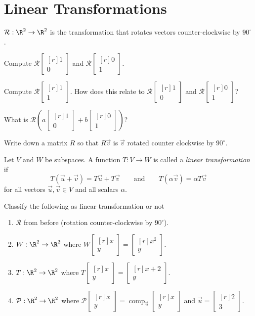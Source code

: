 \documentclass{problemset}
\DeclareMathOperator{\Comp}{comp}
\newcommand{\mat}[1]{\begin{bmatrix*}[r]#1\end{bmatrix*}}
\begin{document}
\hfill
\vfill







	\newpage
\pagestyle{siefken}
\section*{Linear Transformations}
\vspace{-1.5em}
	
	\question
	$\mathcal R:\R^2\to\R^2$ is the transformation that rotates vectors counter-clockwise 
	by $90^\circ$.
	\begin{parts}
		\item Compute $\mathcal R\mat{1\\0}$ and $\mathcal R\mat{0\\1}$.
		\item Compute $\mathcal R\mat{1\\1}$.  How does this relate to
			$\mathcal R\mat{1\\0}$ and $\mathcal R\mat{0\\1}$?
		\item What is $\mathcal R\left(a\mat{1\\0}+b\mat{0\\1}\right)$?
		\item Write down a matrix $R$ so that $R\vec v$ is $\vec v$ rotated
			counter clockwise by $90^\circ$.
	\end{parts}

	\begin{definition}
		Let $V$ and $W$ be subspaces. A function $T:V\to W$ is called a \emph{linear transformation}
		if 
		\[
			T(\vec u+\vec v)=T\vec u+T\vec v \qquad\text{and}\qquad
			T(\alpha \vec v)=\alpha T\vec v
		\]
		for all vectors $\vec u,\vec v\in V$ and all scalars $\alpha$.
	\end{definition}

	\question
	\begin{parts}
		\item Classify the following as linear transformation or not
			\begin{enumerate}
				\item $\mathcal R$ from before (rotation counter-clockwise by $90^\circ$).
				\item $W:\R^2\to\R^2$ where $W\mat{x\\y}=\mat{x^2\\y}$.
				\item $T:\R^2\to\R^2$ where $T\mat{x\\y}=\mat{x+2\\y}$.
				\item $\mathcal P:\R^2\to\R^2$ where 
					$\mathcal P\mat{x\\y}=\Comp_{\vec u}\mat{x\\y}$ and 
					$\vec u=\mat{2\\3}$.
			\end{enumerate}
	\end{parts}
\end{document}

